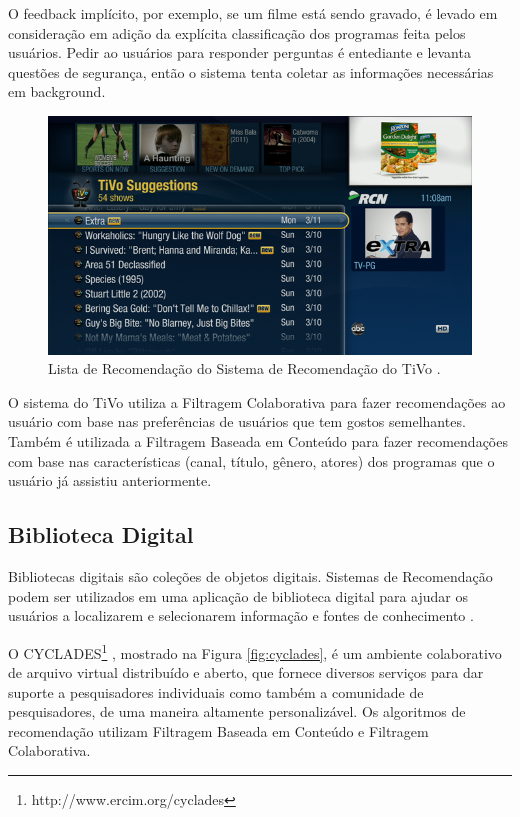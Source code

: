 O feedback implícito, por exemplo, se um filme está sendo gravado, é levado em consideração em adição da explícita classificação dos programas feita pelos usuários. Pedir ao usuários para responder perguntas é entediante e levanta questões de segurança, então o sistema tenta coletar as informações necessárias em background.

\begin{figure}
	\centering
	\includegraphics[scale=0.65]{imagens/TiVo_suggestion.png}
	\caption{Lista de Recomendação do Sistema de Recomendação do TiVo \citep{TiVoSuggestion}.}
	\label{fig:tivo_recomendacao}
\end{figure} 

O sistema do TiVo utiliza a Filtragem Colaborativa para fazer recomendações ao usuário com base nas preferências de usuários que tem gostos semelhantes. Também é utilizada a Filtragem Baseada em Conteúdo para fazer recomendações com base nas características (canal, título, gênero, atores) dos programas que o usuário já assistiu anteriormente.

\subsection{Biblioteca Digital}

Bibliotecas digitais são coleções de objetos digitais. Sistemas de Recomendação podem ser utilizados em uma aplicação de biblioteca digital para ajudar os usuários a localizarem e selecionarem informação e fontes de conhecimento \citep{Porcel:2010:DII:1663649.1663728}.

O CYCLADES\footnote{http://www.ercim.org/cyclades} \citep{rendaIPM05}, mostrado na Figura \ref{fig:cyclades}, é um ambiente colaborativo de arquivo virtual distribuído e aberto, que fornece diversos serviços para dar suporte a pesquisadores individuais como também a comunidade de pesquisadores, de uma maneira altamente personalizável. Os algoritmos de recomendação utilizam Filtragem Baseada em Conteúdo e Filtragem Colaborativa.


